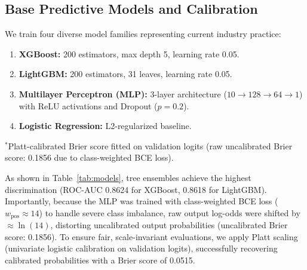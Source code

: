 \documentclass[conference]{IEEEtran}
\begin{document}
\subsection{Base Predictive Models and Calibration}
We train four diverse model families representing current industry practice:
\begin{enumerate}
    \item \textbf{XGBoost:} 200 estimators, max depth 5, learning rate 0.05.
    \item \textbf{LightGBM:} 200 estimators, 31 leaves, learning rate 0.05.
    \item \textbf{Multilayer Perceptron (MLP):} 3-layer architecture ($10 \to 128 \to 64 \to 1$) with ReLU activations and Dropout ($p=0.2$).
    \item \textbf{Logistic Regression:} L2-regularized baseline.
\end{enumerate}

\begin{table}[htbp]
\caption{Model Predictive Performance on Held-Out Test Set}
\label{tab:models}
\centering
{}
\vspace{1mm}
\begin{minipage}{\columnwidth}
\scriptsize $^*$Platt-calibrated Brier score fitted on validation logits (raw uncalibrated Brier score: 0.1856 due to class-weighted BCE loss).
\end{minipage}
\end{table}

As shown in Table~\ref{tab:models}, tree ensembles achieve the highest discrimination (ROC-AUC 0.8624 for XGBoost, 0.8618 for LightGBM). 
Importantly, because the MLP was trained with class-weighted BCE loss ($w_{\text{pos}} \approx 14$) to handle severe class imbalance, raw output log-odds were shifted by $\approx \ln(14)$, distorting uncalibrated output probabilities (uncalibrated Brier score: 0.1856). 
To ensure fair, scale-invariant evaluations, we apply Platt scaling (univariate logistic calibration on validation logits), successfully recovering calibrated probabilities with a Brier score of 0.0515.
\end{document}

